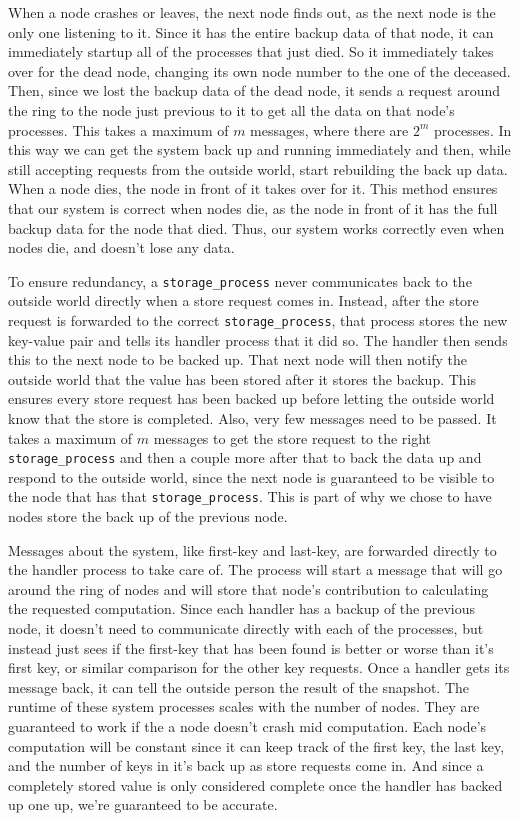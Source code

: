 \documentclass[12pt,letterpaper]{article}
\renewcommand{\tt}[1]{\texttt{#1}}
\renewcommand{\sp}{\tt{storage\_process}}
\begin{document}
When a node crashes or leaves, the next node finds out, as the next node is the only one listening to it. Since it has the entire backup data of that node, it can immediately startup all of the processes that just died. So it immediately takes over for the dead node, changing its own node number to the one of the deceased. Then, since we lost the backup data of the dead node, it sends a request around the ring to the node just previous to it to get all the data on that node's processes. This takes a maximum of $m$ messages, where there are $2^m$ processes. In this way we can get the system back up and running immediately and then, while still accepting requests from the outside world, start rebuilding the back up data. When a node dies, the node in front of it takes over for it. This method ensures that our system is correct when nodes die, as the node in front of it has the full backup data for the node that died. Thus, our system works correctly even when nodes die, and doesn't lose any data.

To ensure redundancy, a \sp{} never communicates back to the outside world directly when a store request comes in. Instead, after the store request is forwarded to the correct \sp, that process stores the new key-value pair and tells its handler process that it did so. The handler then sends this to the next node to be backed up. That next node will then notify the outside world that the value has been stored after it stores the backup. This ensures every store request has been backed up before letting the outside world know that the store is completed. Also, very few messages need to be passed. It takes a maximum of $m$ messages to get the store request to the right \sp{} and then a couple more after that to back the data up and respond to the outside world, since the next node is guaranteed to be visible to the node that has that \sp. This is part of why we chose to have nodes store the back up of the previous node.

Messages about the system, like first-key and last-key, are forwarded directly to the handler process to take care of. The process will start a message that will go around the ring of nodes and will store that node's contribution to calculating the requested computation. Since each handler has a backup of the previous node, it doesn't need to communicate directly with each of the processes, but instead just sees if the first-key that has been found is better or worse than it's first key, or similar comparison for the other key requests. Once a handler gets its message back, it can tell the outside person the result of the snapshot. The runtime of these system processes scales with the number of nodes. They are guaranteed to work if the a node doesn't crash mid computation. Each node's computation will be constant since it can keep track of the first key, the last key, and the number of keys in it's back up as store requests come in. And since a completely stored value is only considered complete once the handler has backed up one up, we're guaranteed to be accurate.
\end{document}
